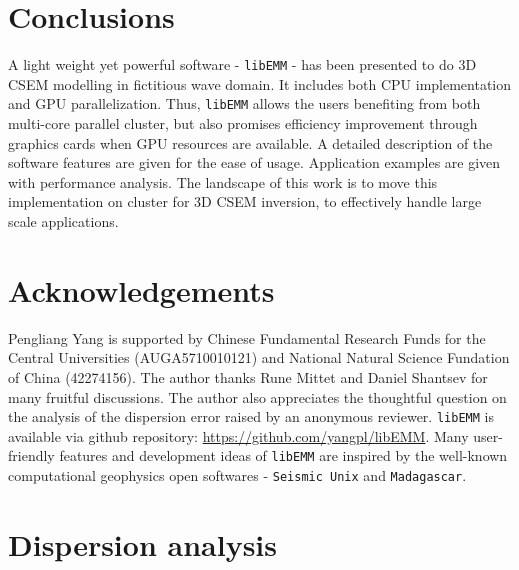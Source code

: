\documentclass[a4paper,10pt]{article}
\begin{document}
\section{Conclusions}

A light weight yet powerful software - \verb|libEMM| - has been presented to do 3D CSEM modelling in fictitious wave domain. It includes both CPU implementation and GPU parallelization. Thus, \verb|libEMM| allows the users benefiting from both multi-core parallel cluster, but also promises efficiency improvement through graphics cards when GPU resources are available. A detailed description of the software features are given for the ease of usage. Application examples are given with performance analysis. The landscape of this work is to move this implementation on cluster for 3D CSEM inversion, to effectively handle large scale applications.


\section*{Acknowledgements}


Pengliang Yang is supported by Chinese Fundamental Research Funds for the Central
Universities (AUGA5710010121) and National Natural Science Fundation of China (42274156). The author thanks Rune Mittet and Daniel Shantsev for many fruitful discussions. The author also appreciates the thoughtful question on the analysis of the dispersion error raised by an anonymous reviewer. \verb|libEMM| is available via github repository: \url{https://github.com/yangpl/libEMM}. Many user-friendly features and development ideas of \verb|libEMM| are inspired by the well-known computational geophysics open softwares - \verb|Seismic Unix| and \verb|Madagascar|.




\appendix
\section{Dispersion analysis}
\end{document}
